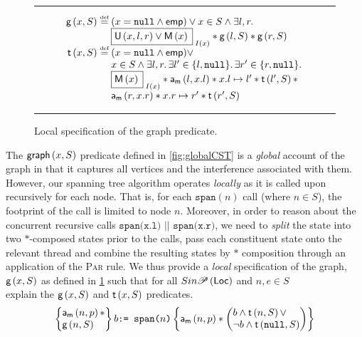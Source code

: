 %
\begin{figure}
%
\hrule
\[
\begin{array}{r @{\hspace*{2pt}} l}
	\g{x}{S} \eqdef & (x = \nil \land \emp) \lor x \in S \land \exsts{l, r}\\
	& \shared{\unmarked{x}{l}{r} \lor \marked{x}}{I(x)} * \g{l}{S} * \g{r}{S}\\
	
	\tr{x}{S} \eqdef & (x = \nil \land \emp) \lor \\
	& x \in S \land \exsts{l, r}\exsts{l' \in \{l, \nil\}} \exsts{r' \in \{r, \nil\}}\\
	&  \shared{\marked{x}}{I(x)} * \markT{l}{x.l} * \cell{x.l}{l'} * \tr{l'}{S} * \\
	&  \markT{r}{x.r} * \cell{x.r}{r'} *\tr{r'}{S}
\end{array}
\]
\hrule
\label{fig:localCST}
\caption{Local specification of the graph predicate.}
\end{figure}
%
The $\textsf{graph}\left(x, S\right)$ predicate defined in \fig\ref{fig:globalCST} is a \emph{global} account of the graph in that it captures all vertices and the interference associated with them. However, our spanning tree algorithm operates \emph{locally} as it is called upon recursively for each node. That is, for each $\texttt{span}(n)$ call (where $n \in S$), the footprint of the call is limited to node $n$. Moreover, in order to reason about the concurrent recursive calls $\texttt{span(x.l) || span(x.r)}$, we need to \emph{split} the state into two $*$-composed states prior to the calls, pass each constituent state onto the relevant thread and combine the resulting states by $*$ composition through an application of the \textsc{Par} rule. We thus provide a \emph{local} specification of the graph, $\textsf{g}\left(x, S\right)$ as defined in \fig\ref{fig:localCST} such that for all $S in \mathscr{P}\left(\textsf{Loc} \right)$ and $n, e \in S$  \\

\todo explain the $\textsf{g}\left(x, S\right)$ and $\textsf{t}\left(x, S\right)$ predicates. 
%
\[
	\left\{
	\begin{array}{@{} l @{}}
		\markT{n}{p} * \\
		\g{n}{S}
	\end{array}
	\right\}  
%	
	b\texttt{:= span(}n\texttt{)} 
%
	\left\{
	\begin{array}{@{} l @{}}
		\markT{n}{p} * 
		\left(
		\begin{array}{@{} l @{}}
			b \land \tr{n}{S} \lor\\
			\neg b \land \tr{\nil}{S}
		\end{array}
		\right)
	\end{array}
	\right\}
\]
%



